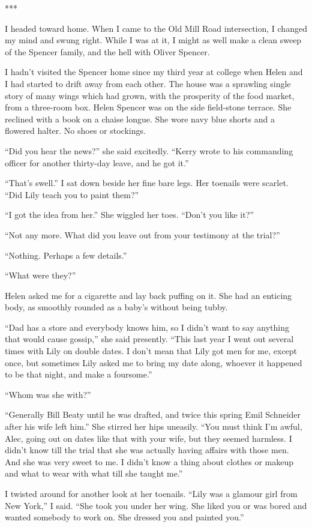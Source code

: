\documentclass{novel}
\begin{document}
***

I headed toward home. When I came to the Old Mill Road intersection, I changed my mind and swung right. While I was at it, I might as well make a clean sweep of the Spencer family, and the hell with Oliver Spencer.

I hadn’t visited the Spencer home since my third year at college when Helen and I had started to drift away from each other. The house was a sprawling single story of many wings which had grown, with the prosperity of the food market, from a three-room box. Helen Spencer was on the side field-stone terrace. She reclined with a book on a chaise longue. She wore navy blue shorts and a flowered halter. No shoes or stockings.

“Did you hear the news?” she said excitedly. “Kerry wrote to his commanding officer for another thirty-day leave, and he got it.”

“That’s swell.” I sat down beside her fine bare legs. Her toenails were scarlet. “Did Lily teach you to paint them?”

“I got the idea from her.” She wiggled her toes. “Don’t you like it?”

“Not any more. What did you leave out from your testimony at the trial?”

“Nothing. Perhaps a few details.”

“What were they?”

Helen asked me for a cigarette and lay back puffing on it. She had an enticing body, as smoothly rounded as a baby’s without being tubby.

“Dad has a store and everybody knows him, so I didn’t want to say anything that would cause gossip,” she said presently. “This last year I went out several times with Lily on double dates. I don’t mean that Lily got men for me, except once, but sometimes Lily asked me to bring my date along, whoever it happened to be that night, and make a foursome.”

“Whom was she with?”

“Generally Bill Beaty until he was drafted, and twice this spring Emil Schneider after his wife left him.” She stirred her hips uneasily. “You must think I’m awful, Alec, going out on dates like that with your wife, but they seemed harmless. I didn’t know till the trial that she was actually having affairs with those men. And she was very sweet to me. I didn’t know a thing about clothes or makeup and what to wear with what till she taught me.”

I twisted around for another look at her toenails. “Lily was a glamour girl from New York,” I said. “She took you under her wing. She liked you or was bored and wanted somebody to work on. She dressed you and painted you.”
\end{document}
